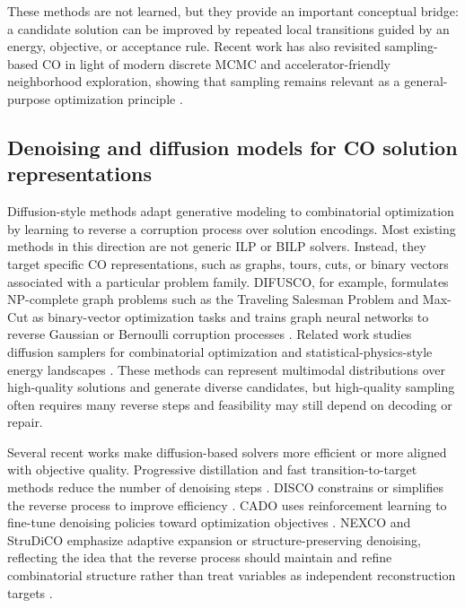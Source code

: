 These methods are not learned, but they provide an important conceptual bridge: a candidate solution can be improved by repeated local transitions guided by an energy, objective, or acceptance rule. Recent work has also revisited sampling-based CO in light of modern discrete MCMC and accelerator-friendly neighborhood exploration, showing that sampling remains relevant as a general-purpose optimization principle \cite{sun_revisiting_2023}.

\subsection{Denoising and diffusion models for CO solution representations}
\label{subsec:rw_diffusion_co}

Diffusion-style methods adapt generative modeling to combinatorial optimization by learning to reverse a corruption process over solution encodings. Most existing methods in this direction are not generic ILP or BILP solvers. Instead, they target specific CO representations, such as graphs, tours, cuts, or binary vectors associated with a particular problem family. DIFUSCO, for example, formulates NP-complete graph problems such as the Traveling Salesman Problem and Max-Cut as binary-vector optimization tasks and trains graph neural networks to reverse Gaussian or Bernoulli corruption processes \cite{sun_difusco_2023}. Related work studies diffusion samplers for combinatorial optimization and statistical-physics-style energy landscapes \cite{sanokowski_diffusion_2024,sanokowski_scalable_2025}. These methods can represent multimodal distributions over high-quality solutions and generate diverse candidates, but high-quality sampling often requires many reverse steps and feasibility may still depend on decoding or repair.

Several recent works make diffusion-based solvers more efficient or more aligned with objective quality. Progressive distillation and fast transition-to-target methods reduce the number of denoising steps \cite{huang_accelerating_2023,li_t2t_2023,li_fast_2025}. DISCO constrains or simplifies the reverse process to improve efficiency \cite{zhao_disco_2025}. CADO uses reinforcement learning to fine-tune denoising policies toward optimization objectives \cite{yoon_cado_2024}. NEXCO and StruDiCO emphasize adaptive expansion or structure-preserving denoising, reflecting the idea that the reverse process should maintain and refine combinatorial structure rather than treat variables as independent reconstruction targets \cite{wang_native_2025,wang_strudico_2025}.

